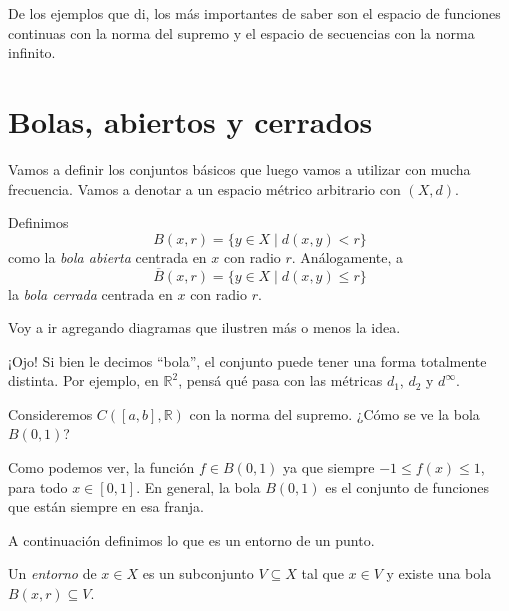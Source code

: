 De los ejemplos que di, los más importantes de saber son el espacio de funciones continuas con la norma del supremo y el espacio de secuencias con la norma infinito.


\section{Bolas, abiertos y cerrados}

Vamos a definir los conjuntos básicos que luego vamos a utilizar con mucha frecuencia. Vamos a denotar a un espacio métrico arbitrario con $(X, d)$.

\begin{definition}
	Definimos
	$$
		B(x, r) = \{ y \in X \mid d(x, y) < r\}
	$$
	como la \emph{bola abierta} centrada en $x$ con radio $r$. Análogamente, a
	$$
		\overline{B}(x, r) = \{ y \in X \mid d(x, y) \leq  r\}
	$$
	la \emph{bola cerrada} centrada en $x$ con radio $r$.
\end{definition}

Voy a ir agregando diagramas que ilustren más o menos la idea.

\begin{center}
	
\end{center}

¡Ojo! Si bien le decimos ``bola'', el conjunto puede tener una forma totalmente distinta. Por ejemplo, en $\mathbb{R}^2$, pensá qué pasa con las métricas $d_1$, $d_2$ y $d^{\infty}$.

\begin{example}
	Consideremos $C([a, b], \mathbb{R})$ con la norma del supremo. ¿Cómo se ve la bola $B(0, 1)$?

	\begin{center}
		
	\end{center}

	Como podemos ver, la función $f \in B(0, 1)$ ya que siempre $-1 \leq f(x) \leq 1$, para todo $x \in [0, 1]$. En general, la bola $B(0, 1)$ es el conjunto de funciones que están siempre en esa franja.
\end{example}

A continuación definimos lo que es un entorno de un punto.

\begin{definition}
	Un \emph{entorno} de $x \in X$ es un subconjunto $V \subseteq X$ tal que $x \in V$ y existe una bola $B(x, r) \subseteq V$.
\end{definition}

